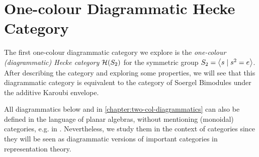 \section{One-colour Diagrammatic Hecke Category}
\label{sec:one-col-sbim}

The first one-colour diagrammatic category we explore is the \textit{one-colour (diagrammatic) Hecke category} $\mathcal{H}(S_2)$ for the symmetric group $S_2 = {\left\langle s \mathrel{|} s^2 = e \right\rangle}$. After describing the category and exploring some properties, we will see that this diagrammatic category is equivalent to the category of Soergel Bimodules under the additive Karoubi envelope.

\begin{remark}
    All diagrammatics below and in \autoref{chapter:two-col-diagrammatics} can also be defined in the language of planar algebras, without mentioning (monoidal) categories, e.g. in \cite{jones-planar-algebra}. Nevertheless, we study them in the context of categories since they will be seen as diagrammatic versions of important categories in representation theory.
\end{remark}

